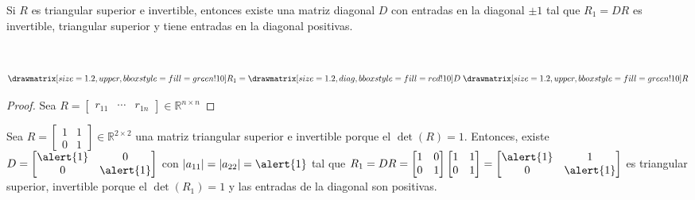 \begin{frame}
	\begin{theorem}
		Si $R$ es triangular superior e invertible, entonces existe
		una matriz diagonal $D$ con entradas en la diagonal $\pm 1$ tal
		que $R_{1}=DR$ es invertible, triangular superior y tiene
		entradas en la diagonal positivas.

		\

		\begin{equation*}
			\drawmatrix[size=1.2, upper, bbox style={fill=green!10}]{R_{1}}=
			\drawmatrix[size=1.2, diag, bbox style={fill=red!10}]{D}\;
			\drawmatrix[size=1.2, upper, bbox style={fill=green!10}]{R}
		\end{equation*}
	\end{theorem}

	\begin{proof}
		Sea
		\begin{math}
			R=\begin{bmatrix}
				r_{11} & \cdots & r_{1n}
			\end{bmatrix}\in\mathbb{R}^{n\times n}
		\end{math}
	\end{proof}

	\begin{example}
		Sea
		\begin{math}
			R=
			\begin{bmatrix}
				1 & 1 \\
				0 & 1
			\end{bmatrix}\in\mathbb{R}^{2\times 2}
		\end{math}
		una matriz triangular superior e invertible porque el
		$\det\left(R\right)=1$.
		Entonces, existe
		\begin{math}
			D=
			\begin{bmatrix}
				\alert{1} & 0         \\
				0         & \alert{1}
			\end{bmatrix}
		\end{math}
		con
		\begin{math}
			\left|a_{11}\right|=
			\left|a_{22}\right|=
			\alert{1}
		\end{math}
		tal que
		\begin{math}
			R_{1}=
			DR=
			\begin{bmatrix}
				1 & 0 \\
				0 & 1
			\end{bmatrix}
			\begin{bmatrix}
				1 & 1 \\
				0 & 1
			\end{bmatrix}=
			\begin{bmatrix}
				\alert{1} & 1         \\
				0         & \alert{1}
			\end{bmatrix}
		\end{math}
		es triangular superior, invertible porque el
		$\det\left(R_{1}\right)=1$ y las entradas
		de la diagonal son \alert{positivas}.
	\end{example}
\end{frame}


